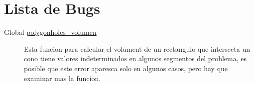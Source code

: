\hypertarget{bug}{}\section{Lista de Bugs}\label{bug}
\label{bug__bug000001}
\hypertarget{bug__bug000001}{}
 \begin{description}
\item[Global \hyperlink{group__geometry_g7cf8b3f8c76179bb936754bbbf510999_g7cf8b3f8c76179bb936754bbbf510999}{polygonholes\_\-volumen} ]Esta funcion para calcular el volument de un rectangulo que intersecta un cono tiene valores indeterminados en algunos segmentos del problema, es posible que este error aparesca solo en algunos casos, pero hay que examinar mas la funcion. \end{description}
